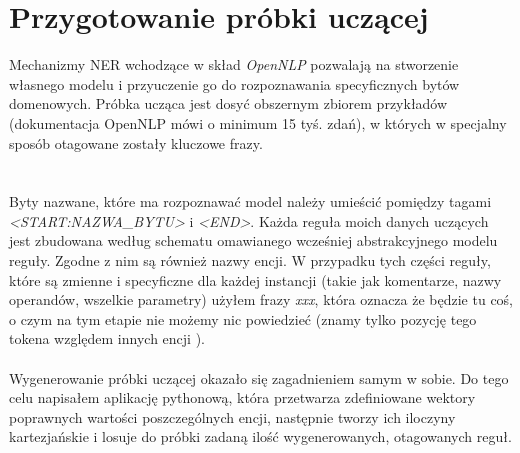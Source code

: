 \section{Przygotowanie próbki uczącej}
Mechanizmy NER wchodzące w skład \textit{OpenNLP} pozwalają na stworzenie własnego modelu i przyuczenie go do rozpoznawania specyficznych bytów domenowych. Próbka ucząca jest dosyć obszernym zbiorem przykładów (dokumentacja OpenNLP mówi o minimum 15 tyś. zdań), w których w specjalny sposób otagowane zostały kluczowe frazy. 
\\ \\

\paragraph{}
Byty nazwane, które ma rozpoznawać model należy umieścić pomiędzy tagami \\ \textit{<START:NAZWA\_BYTU>} i \textit{<END>}. Każda reguła moich danych uczących jest zbudowana według schematu omawianego wcześniej abstrakcyjnego modelu reguły. Zgodne z nim są również nazwy encji.
W przypadku tych części reguły, które są zmienne i specyficzne dla każdej instancji (takie jak komentarze, nazwy operandów, wszelkie parametry) użyłem frazy \textit{xxx}, która oznacza że będzie tu coś, o czym na tym etapie nie możemy nic powiedzieć (znamy tylko pozycję tego tokena względem innych encji ). 
\paragraph{}
Wygenerowanie próbki uczącej okazało się zagadnieniem samym w sobie. Do tego celu napisałem aplikację pythonową, która przetwarza zdefiniowane wektory poprawnych wartości poszczególnych encji, następnie tworzy ich iloczyny kartezjańskie i losuje do próbki zadaną ilość wygenerowanych, otagowanych reguł.

